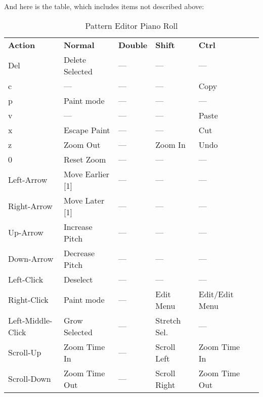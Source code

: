    And here is the table, which includes items not described above:

   \begin{table}[H]
      \centering
      \caption{Pattern Editor Piano Roll}
      \label{table:pattern_editor_piano_roll}
      \begin{tabular}{l l l l l l}
         \textbf{Action}   & \textbf{Normal} & \textbf{Double}    & \textbf{Shift} & \textbf{Ctrl}    \\
         Del               & Delete Selected & ---                & ---            & ---              \\
         c                 & ---             & ---                & ---            & Copy             \\
         p                 & Paint mode      & ---                & ---            & ---              \\
         v                 & ---             & ---                & ---            & Paste            \\
         x                 & Escape Paint    & ---                & ---            & Cut              \\
         z                 & Zoom Out        & ---                & Zoom In        & Undo             \\
         0                 & Reset Zoom      & ---                & ---            & ---              \\
         Left-Arrow        & Move Earlier [1] & ---               & ---            & ---              \\
         Right-Arrow       & Move Later [1]  & ---                & ---            & ---              \\
         Up-Arrow          & Increase Pitch  & ---                & ---            & ---              \\
         Down-Arrow        & Decrease Pitch  & ---                & ---            & ---              \\
         Left-Click        & Deselect        & ---                & ---            & ---              \\
         Right-Click       & Paint mode      & ---                & Edit Menu      & Edit/Edit Menu   \\
         Left-Middle-Click & Grow Selected   & ---                & Stretch Sel.   & ---              \\
         Scroll-Up         & Zoom Time In    & ---                & Scroll Left    & Zoom Time In     \\
         Scroll-Down       & Zoom Time Out   & ---                & Scroll Right   & Zoom Time Out    \\
      \end{tabular}
   \end{table}

